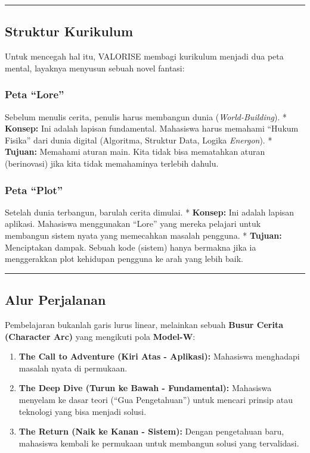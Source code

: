 \documentclass[
  letterpaper,
  DIV=11,
  numbers=noendperiod]{scrreprt}
\providecommand{\tightlist}{%
  \setlength{\itemsep}{0pt}\setlength{\parskip}{0pt}}
\begin{document}
\begin{center}\rule{0.5\linewidth}{0.5pt}\end{center}

\subsection{Struktur Kurikulum}\label{struktur-kurikulum}

Untuk mencegah hal itu, VALORISE membagi kurikulum menjadi dua peta
mental, layaknya menyusun sebuah novel fantasi:

\subsubsection{Peta ``Lore''}\label{peta-lore}

Sebelum menulis cerita, penulis harus membangun dunia
(\emph{World-Building}). * \textbf{Konsep:} Ini adalah lapisan
fundamental. Mahasiswa harus memahami ``Hukum Fisika'' dari dunia
digital (Algoritma, Struktur Data, Logika \emph{Energon}). *
\textbf{Tujuan:} Memahami aturan main. Kita tidak bisa mematahkan aturan
(berinovasi) jika kita tidak memahaminya terlebih dahulu.

\subsubsection{Peta ``Plot''}\label{peta-plot}

Setelah dunia terbangun, barulah cerita dimulai. * \textbf{Konsep:} Ini
adalah lapisan aplikasi. Mahasiswa menggunakan ``Lore'' yang mereka
pelajari untuk membangun sistem nyata yang memecahkan masalah pengguna.
* \textbf{Tujuan:} Menciptakan dampak. Sebuah kode (sistem) hanya
bermakna jika ia menggerakkan plot kehidupan pengguna ke arah yang lebih
baik.

\begin{center}\rule{0.5\linewidth}{0.5pt}\end{center}

\subsection{Alur Perjalanan}\label{alur-perjalanan}

Pembelajaran bukanlah garis lurus linear, melainkan sebuah \textbf{Busur
Cerita (Character Arc)} yang mengikuti pola \textbf{Model-W}:

\begin{enumerate}
\def\labelenumi{\arabic{enumi}.}
\tightlist
\item
  \textbf{The Call to Adventure (Kiri Atas - Aplikasi):} Mahasiswa
  menghadapi masalah nyata di permukaan.
\item
  \textbf{The Deep Dive (Turun ke Bawah - Fundamental):} Mahasiswa
  menyelam ke dasar teori (``Gua Pengetahuan'') untuk mencari prinsip
  atau teknologi yang bisa menjadi solusi.
\item
  \textbf{The Return (Naik ke Kanan - Sistem):} Dengan pengetahuan baru,
  mahasiswa kembali ke permukaan untuk membangun solusi yang
  tervalidasi.
\end{enumerate}
\end{document}
